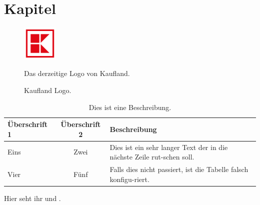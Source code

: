 \documentclass[a4paper, 12pt, oneside, openany]{scrbook}
\begin{document}
\mainmatter

\chapter{Kapitel}

\begin{figure}[H]
    \centering
    \includegraphics[width=0.15\textwidth]{images/kis.png}
    \caption{Kaufland Logo.}
    \small Das derzeitige Logo von Kaufland.
    \label{fig-kis-small}
\end{figure}

\begin{table}[H]
    \centering
    \begin{tabular}{l c p{5cm}}
        \toprule
        Überschrift 1 & Überschrift 2 & Beschreibung \\
        \midrule
        Eins & Zwei & Dies ist ein sehr langer Text der in die nächste Zeile rut-schen soll. &  \\
        Vier & Fünf & Falls dies nicht passiert, ist die Tabelle falsch konfigu-riert. \\
        \bottomrule
    \end{tabular}
    \caption{Dies ist eine Beschreibung.}
    \label{tab-test}
\end{table}
Hier seht ihr  und .

\nocite{*}

\backmatter

\sloppy

\cleardoublepage
{}
\end{document}
